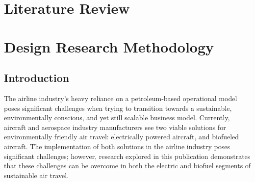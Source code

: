\documentclass{article}
\begin{document}
\newpage
\section{Literature Review}\label{litRev}
 
 \blindtext
\newpage
\section{Design Research Methodology}\label{designReview}
\subsection{Introduction}\label{designIntro}
The airline industry’s heavy reliance on a petroleum-based operational model poses significant challenges when trying to transition towards a sustainable, environmentally conscious, and yet still scalable business model. Currently, aircraft and aerospace industry manufacturers see two viable solutions for environmentally friendly air travel: electrically powered aircraft, and biofueled aircraft. The implementation of both solutions in the airline industry poses significant challenges; however, research explored in this publication demonstrates that these challenges can be overcome in both the electric and biofuel segments of sustainable air travel.\par
\end{document}
